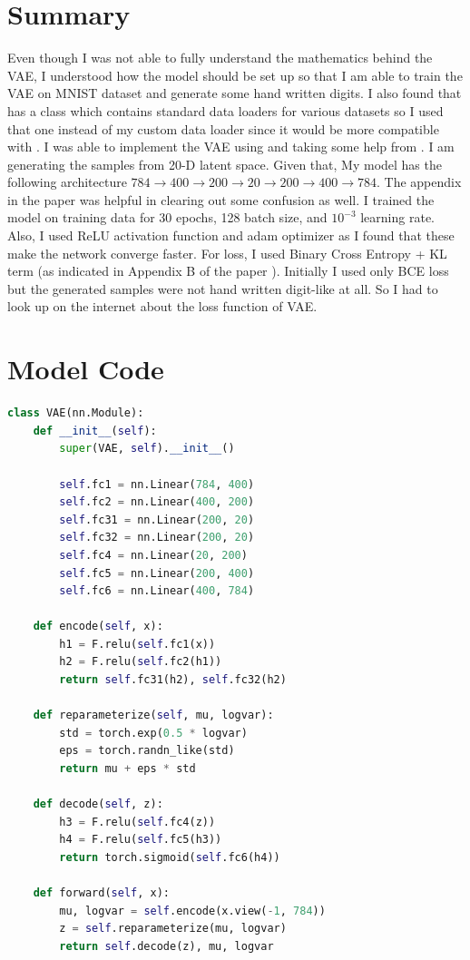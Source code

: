 \documentclass{article}
\begin{document}
\thispagestyle{firstpage}

\section{Summary}

Even though I was not able to fully understand the mathematics behind the VAE, I understood how the model should be set up so that I am able to train the VAE on MNIST dataset and generate some hand written digits. I also found that  has a  class which contains standard data loaders for various datasets so I used that one instead of my custom data loader since it would be more compatible with . I was able to implement the VAE using  and taking some help from . I am generating the samples from 20-D latent space. Given that, My model has the following architecture $784 \rightarrow 400 \rightarrow 200 \rightarrow 20 \rightarrow 200 \rightarrow 400 \rightarrow 784$. The appendix in the paper \cite{1} was helpful in clearing out some confusion as well. I trained the model on training data for 30 epochs, 128 batch size, and $10^{-3}$ learning rate. Also, I used ReLU activation function and adam optimizer as I found that these make the network converge faster. For loss, I used Binary Cross Entropy + KL term (as indicated in Appendix B of the paper \cite{1}). Initially I used only BCE loss but the generated samples were not hand written digit-like at all. So I had to look up on the internet about the loss function of VAE.

\section{Model Code}

\begin{lstlisting}[language=Python]
class VAE(nn.Module):
    def __init__(self):
        super(VAE, self).__init__()

        self.fc1 = nn.Linear(784, 400)
        self.fc2 = nn.Linear(400, 200)
        self.fc31 = nn.Linear(200, 20)
        self.fc32 = nn.Linear(200, 20)
        self.fc4 = nn.Linear(20, 200)
        self.fc5 = nn.Linear(200, 400)
        self.fc6 = nn.Linear(400, 784)

    def encode(self, x):
        h1 = F.relu(self.fc1(x))
        h2 = F.relu(self.fc2(h1))
        return self.fc31(h2), self.fc32(h2)

    def reparameterize(self, mu, logvar):
        std = torch.exp(0.5 * logvar)
        eps = torch.randn_like(std)
        return mu + eps * std

    def decode(self, z):
        h3 = F.relu(self.fc4(z))
        h4 = F.relu(self.fc5(h3))
        return torch.sigmoid(self.fc6(h4))

    def forward(self, x):
        mu, logvar = self.encode(x.view(-1, 784))
        z = self.reparameterize(mu, logvar)
        return self.decode(z), mu, logvar
\end{lstlisting}
\end{document}
